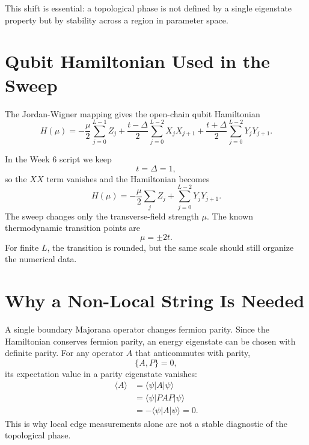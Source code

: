 \documentclass[11pt]{article}
\newcommand{\ket}[1]{|#1\rangle}
\newcommand{\bra}[1]{\langle#1|}
\begin{document}
This shift is essential: a topological phase is not defined by a single eigenstate property but by stability across a region in parameter space.
\section{Qubit Hamiltonian Used in the Sweep}

The Jordan-Wigner mapping gives the open-chain qubit Hamiltonian
\begin{equation}
  H(\mu)
  = -\frac{\mu}{2}\sum_{j=0}^{L-1} Z_j
    + \frac{t-\Delta}{2}\sum_{j=0}^{L-2} X_jX_{j+1}
    + \frac{t+\Delta}{2}\sum_{j=0}^{L-2} Y_jY_{j+1}.
\end{equation}

In the Week 6 script we keep
\begin{equation}
  t=\Delta=1,
\end{equation}
so the $XX$ term vanishes and the Hamiltonian becomes
\begin{equation}
  H(\mu) = -\frac{\mu}{2}\sum_j Z_j + \sum_{j=0}^{L-2} Y_jY_{j+1}.
\end{equation}
The sweep changes only the transverse-field strength $\mu$. The known thermodynamic transition points are
\begin{equation}
  \mu = \pm 2t.
\end{equation}
For finite $L$, the transition is rounded, but the same scale should still organize the numerical data.

\section{Why a Non-Local String Is Needed}

A single boundary Majorana operator changes fermion parity. Since the Hamiltonian conserves fermion parity, an energy eigenstate can be chosen with definite parity. For any operator $A$ that anticommutes with parity,
\begin{equation}
  \{A,P\}=0,
\end{equation}
its expectation value in a parity eigenstate vanishes:
\begin{align}
  \langle A\rangle
  &= \bra{\psi} A \ket{\psi} \\
  &= \bra{\psi} P A P \ket{\psi} \\
  &= -\bra{\psi} A \ket{\psi}
  = 0.
\end{align}
This is why local edge measurements alone are not a stable diagnostic of the topological phase.
\end{document}
